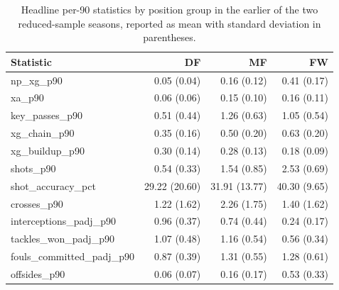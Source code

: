 \begin{table}[t]
\centering
\small
\caption{Headline per-90 statistics by position group in the earlier of the two reduced-sample seasons, reported as mean with standard deviation in parentheses.}
\label{tab:summary}
\begin{tabular}{lrrr}
\toprule
Statistic & DF & MF & FW \\
\midrule
np\_xg\_p90 & 0.05 (0.04) & 0.16 (0.12) & 0.41 (0.17) \\
xa\_p90 & 0.06 (0.06) & 0.15 (0.10) & 0.16 (0.11) \\
key\_passes\_p90 & 0.51 (0.44) & 1.26 (0.63) & 1.05 (0.54) \\
xg\_chain\_p90 & 0.35 (0.16) & 0.50 (0.20) & 0.63 (0.20) \\
xg\_buildup\_p90 & 0.30 (0.14) & 0.28 (0.13) & 0.18 (0.09) \\
shots\_p90 & 0.54 (0.33) & 1.54 (0.85) & 2.53 (0.69) \\
shot\_accuracy\_pct & 29.22 (20.60) & 31.91 (13.77) & 40.30 (9.65) \\
crosses\_p90 & 1.22 (1.62) & 2.26 (1.75) & 1.40 (1.62) \\
interceptions\_padj\_p90 & 0.96 (0.37) & 0.74 (0.44) & 0.24 (0.17) \\
tackles\_won\_padj\_p90 & 1.07 (0.48) & 1.16 (0.54) & 0.56 (0.34) \\
fouls\_committed\_padj\_p90 & 0.87 (0.39) & 1.31 (0.55) & 1.28 (0.61) \\
offsides\_p90 & 0.06 (0.07) & 0.16 (0.17) & 0.53 (0.33) \\
\bottomrule
\end{tabular}
\end{table}
